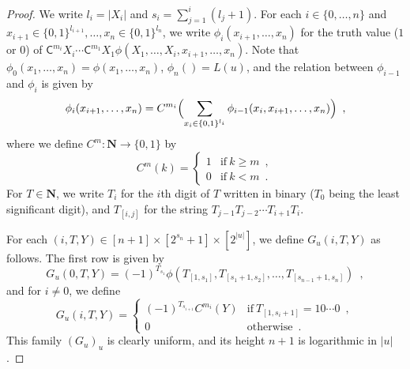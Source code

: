 \documentclass[12pt,a4paper]{article}
\theoremstyle{definition}
\theoremstyle{remark}
\newcommand{\N}{\mathbf N}
\newcommand{\quantC}{\mathsf{C}}
\begin{document}
\begin{proof}
We write $l_i = |X_i|$ and $s_i = \sum^i_{j=1} (l _j + 1)$.
For each $i \in \{0, \dots, n\}$ and
$x _{i+1} \in \{0,1\}^{l_{i+1}}, \dots, x _n \in \{0,1\}^{l_n}$,
we write $\phi_i(x_{i+1}, \dots, x_n)$ for the truth value ($1$ or $0$) of $
\quantC^{m_{i}}{X_i} \cdots \quantC^{m_1}{X_1} \allowbreak 
\phi(X_1, \dots, X_i, x_{i+1}, \dots, x_n)
$.  Note that 
$\phi _0 (x _1, \ldots, x _n) = \phi (x _1, \ldots, x _n)$, 
$\phi _n () = L (u)$, 
and the relation between $\phi _{i - 1}$ and $\phi _i$ is given by 
\begin{equation}
\label{eq:phi-step}
   \phi _i (x _{i+1}, \dots, x_n) 
  = 
   C^{m_i} \Bigl( 
     \sum_{x_i \in \{ 0,1 \} ^{l_i}}
		\phi _{i - 1} (x _i, x_{i+1}, \dots, x_{n})
   \Bigr) \enspace , 
\end{equation}
where we define $C ^m \colon \N \to \{0,1\}$ by 
\begin{equation}
 C ^m (k) 
  = \begin{cases}
     1 & \text{if} \ k \ge m \enspace , \\
     0 & \text{if} \ k < m \enspace .
    \end{cases}
\end{equation}
For $T \in \N$, we write $T_i$ for the 
$i$th digit of $T$ written in binary 
($T _0$ being the least significant digit),
and $T_{[i,j]}$ for the string $T_{j-1} T_{j-2} \cdots T_{i+1} T_{i}$.

For each $(i, T, Y) \in [n+1] \times [2^{s_n}+1] \times [2^{|u|}]$,
we define $G_u (i, T, Y)$ as follows.
The first row is given by
\begin{equation}
\label{eq:def-Gu:case0}
  G_u(0,T,Y) = 
   (-1)^{T_{s_1}}\phi(T_{[1,s_1]}, T_{[s_1+1,s_2]},
    \dots, T_{[s_{n-1}+1,s_n]}) \enspace , 
\end{equation}
and for $i \neq 0$, we define 
\begin{equation} 
  G_u(i,T,Y) = 
   \begin{cases}
    (-1)^{T_{s_{i+1}}} C^{m_i}(Y) 
    & \text{if} \ T_{[1,s_i+1]} = 10 \cdots 0  \enspace , \\
    0 & \text{otherwise}  \enspace .
   \end{cases} 
   \label{eq:def-Gu:case-nonzero}
 \end{equation}
This family $(G_u)_u$ is clearly uniform, 
and its height $n + 1$ is logarithmic in $|u|$.


\end{proof}
\end{document}
